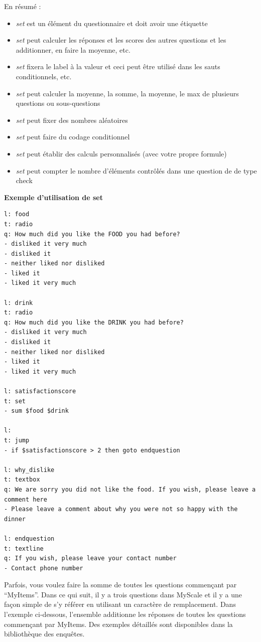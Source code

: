 \documentclass[
]{book}
\providecommand{\tightlist}{%
  \setlength{\itemsep}{0pt}\setlength{\parskip}{0pt}}
\begin{document}
En résumé :

\begin{itemize}
\tightlist
\item
  \emph{set} est un élément du questionnaire et doit avoir une étiquette
\item
  \emph{set} peut calculer les réponses et les scores des autres questions et les additionner, en faire la moyenne, etc.
\item
  \emph{set} fixera le label à la valeur et ceci peut être utilisé dans les sauts conditionnels, etc.
\item
  \emph{set} peut calculer la moyenne, la somme, la moyenne, le max de plusieurs questions ou sous-questions
\item
  \emph{set} peut fixer des nombres aléatoires
\item
  \emph{set} peut faire du codage conditionnel
\item
  \emph{set} peut établir des calculs personnalisés (avec votre propre formule)
\item
  \emph{set} peut compter le nombre d'éléments contrôlés dans une question de de type check
\end{itemize}

\textbf{Exemple d'utilisation de set}

\begin{verbatim}
l: food
t: radio
q: How much did you like the FOOD you had before?
- disliked it very much
- disliked it
- neither liked nor disliked
- liked it
- liked it very much

l: drink
t: radio
q: How much did you like the DRINK you had before?
- disliked it very much
- disliked it
- neither liked nor disliked
- liked it
- liked it very much

l: satisfactionscore
t: set
- sum $food $drink

l:
t: jump
- if $satisfactionscore > 2 then goto endquestion

l: why_dislike
t: textbox
q: We are sorry you did not like the food. If you wish, please leave a comment here
- Please leave a comment about why you were not so happy with the dinner

l: endquestion
t: textline
q: If you wish, please leave your contact number
- Contact phone number
\end{verbatim}

Parfois, vous voulez faire la somme de toutes les questions commençant par ``MyItems''. Dans ce qui suit, il y a trois questions dans MyScale et il y a une façon simple de s'y référer en utilisant un caractère de remplacement. Dans l'exemple ci-dessous, l'ensemble additionne les réponses de toutes les questions commençant par MyItems. Des exemples détaillés sont disponibles dans la bibliothèque des enquêtes.
\end{document}
